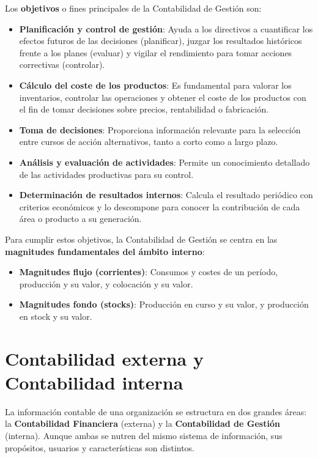 Los \textbf{objetivos} o fines principales de la Contabilidad de Gestión son:
\begin{itemize}
    \item \textbf{Planificación y control de gestión}: Ayuda a los directivos a cuantificar los efectos futuros de las decisiones (planificar), juzgar los resultados históricos frente a los planes (evaluar) y vigilar el rendimiento para tomar acciones correctivas (controlar).
    \item \textbf{Cálculo del coste de los productos}: Es fundamental para valorar los inventarios, controlar las operaciones y obtener el coste de los productos con el fin de tomar decisiones sobre precios, rentabilidad o fabricación.
    \item \textbf{Toma de decisiones}: Proporciona información relevante para la selección entre cursos de acción alternativos, tanto a corto como a largo plazo.
    \item \textbf{Análisis y evaluación de actividades}: Permite un conocimiento detallado de las actividades productivas para su control.
    \item \textbf{Determinación de resultados internos}: Calcula el resultado periódico con criterios económicos y lo descompone para conocer la contribución de cada área o producto a su generación.
\end{itemize}

Para cumplir estos objetivos, la Contabilidad de Gestión se centra en las \textbf{magnitudes fundamentales del ámbito interno}:
\begin{itemize}
    \item \textbf{Magnitudes flujo (corrientes)}: Consumos y costes de un período, producción y su valor, y colocación y su valor.
    \item \textbf{Magnitudes fondo (stocks)}: Producción en curso y su valor, y producción en stock y su valor.
\end{itemize}

\section{Contabilidad externa y Contabilidad interna}

La información contable de una organización se estructura en dos grandes áreas: la \textbf{Contabilidad Financiera} (externa) y la \textbf{Contabilidad de Gestión} (interna). Aunque ambas se nutren del mismo sistema de información, sus propósitos, usuarios y características son distintos.

